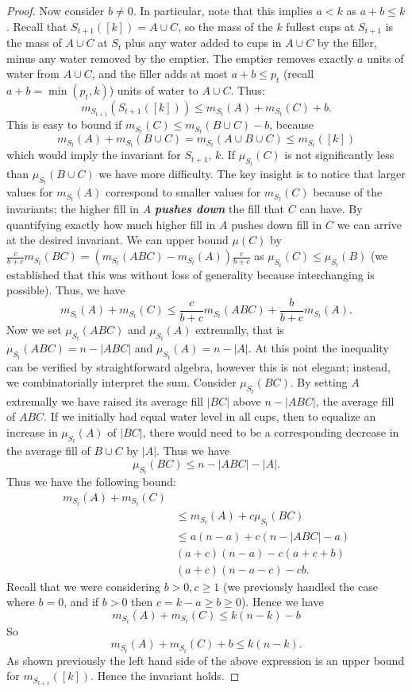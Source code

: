 \documentclass[twocolumn]{article}[11pt]
\newcommand{\defn}[1]{{\textit{\textbf{\boldmath #1}}}}
\begin{document}
\begin{proof}
Now consider $b\neq 0$. In particular, note that this implies $a < k$ as $a+b
\le k$. Recall that $S_{t+1}([k]) = A \cup C$, so the mass of the $k$ fullest
cups at $S_{t+1}$ is the mass of $A\cup C$ at $S_t$ plus any water added to
cups in $A\cup C$ by the filler, minus any water removed by the emptier. 
The emptier removes exactly $a$ units of water from $A\cup C$, and the filler
adds at most $a+b \le p_t$ (recall $a+b = \min(p_t, k)$) units of water to $A\cup C$.
Thus:
$$m_{S_{t+1}}(S_{t+1}([k])) \le m_{S_t}(A) + m_{S_t}(C) + b.$$
This is easy to bound if $m_{S_t}(C) \le m_{S_t}(B\cup C) - b$, because 
$$m_{S_t}(A) + m_{S_t}(B\cup C)  = m_{S_t}(A\cup B\cup C) \le m_{S_t}([k])$$
which would imply the invariant for $S_{t+1}$, $k$.
If $\mu_{S_t}(C)$ is not significantly less than $\mu_{S_t}(B\cup C)$ we have more difficulty.
The key insight is to notice that larger values for $m_{S_t}(A)$ correspond to
smaller values for $m_{S_t}(C)$ because of the invariants; the higher fill in
$A$ \defn{pushes down} the fill that $C$ can have.
By quantifying exactly how much higher fill in $A$ pushes down fill in $C$ we
can arrive at the desired invariant.
We can upper bound $\mu(C)$ by $\frac{c}{b+c}m_{S_t}(BC) = (m_{S_t}(ABC) - m_{S_t}(A))\frac{c}{b+c}$ as
$\mu_{S_t}(C) \le \mu_{S_t}(B)$ (we established that this was without loss of
generality because interchanging is possible).
Thus, we have 
$$m_{S_t}(A) + m_{S_t}(C) \le \frac{c}{b+c}m_{S_t}(ABC) + \frac{b}{b+c}m_{S_t}(A).$$
Now we set $\mu_{S_t}(ABC)$ and $\mu_{S_t}(A)$ extremally, that is
$\mu_{S_t}(ABC) = n-|ABC|$ and $\mu_{S_t}(A) = n-|A|$.
At this point the inequality can be verified by straightforward algebra,
however this is not elegant; instead, we combinatorially interpret the sum.
Consider $\mu_{S_t}(BC)$. By setting $A$ extremally we have raised its average
fill $|BC|$ above $n-|ABC|$, the average fill of $ABC$. If we initially had
equal water level in all cups, then to equalize an increase in $\mu_{S_t}(A)$
of $|BC|$, there would need to be a corresponding decrease in the average fill
of $B\cup C$ by $|A|$.
Thus we have $$\mu_{S_t}(BC) \le n-|ABC|-|A|.$$
Thus we have the following bound:
\begin{align*}
  m_{S_t}(A) + m_{S_t}(C)&\\
&\le m_{S_t}(A) + c\mu_{S_t}(BC)\\
&\le a(n-a) + c(n-|ABC|-a)\\
&(a+c)(n-a) - c(a+c+b)\\
&(a+c)(n-a-c) - cb.
\end{align*}
Recall that we were considering $b> 0, c \ge 1$ (we previously handled the case
where $b=0$, and if $b>0$ then $c=k-a\ge b\ge 0$).
Hence we have 
$$m_{S_t}(A) + m_{S_t}(C) \le k(n-k) -b$$
So 
$$m_{S_t}(A) + m_{S_t}(C)+b \le k(n-k).$$
As shown previously the left hand side of the above expression is an upper bound for $m_{S_{t+1}}([k])$.
Hence the invariant holds.



\end{proof}
\end{document}

